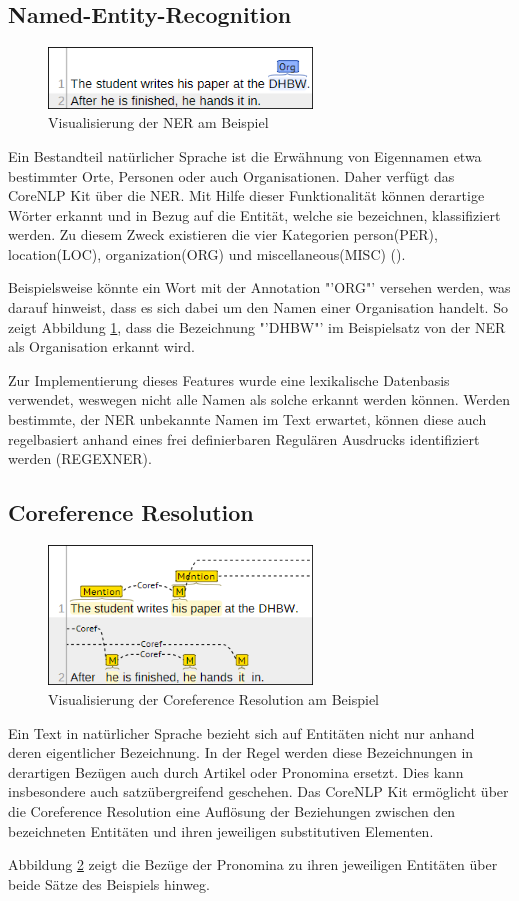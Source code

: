 \subsection{Named-Entity-Recognition}
\label{subsec:ner}
\begin{figure}
\includegraphics[width=7cm]{pictures/NER.png}
\caption{Visualisierung der NER am Beispiel}
\label{fig:NER}
\end{figure}
Ein Bestandteil natürlicher Sprache ist die Erwähnung von Eigennamen etwa bestimmter Orte, Personen oder auch Organisationen. Daher verfügt das CoreNLP Kit über die \ac{NER}. Mit Hilfe dieser Funktionalität können derartige Wörter erkannt und in Bezug auf die Entität, welche sie bezeichnen,  klassifiziert werden. Zu diesem Zweck existieren die vier Kategorien person(PER), location(LOC), organization(ORG) und miscellaneous(MISC) (\cite[vgl.][4]{STANFORDNER}).\par
Beispielsweise könnte ein Wort mit der Annotation "'ORG"' versehen werden, was darauf hinweist, dass es sich dabei um den Namen einer Organisation handelt. So zeigt Abbildung \ref{fig:NER}, dass die Bezeichnung "'DHBW"' im Beispielsatz von der \ac{NER} als Organisation erkannt wird.\par
Zur Implementierung dieses Features wurde eine lexikalische Datenbasis verwendet, weswegen nicht alle Namen als solche erkannt werden können. Werden bestimmte, der \ac{NER} unbekannte Namen im Text erwartet, können diese auch regelbasiert anhand eines frei definierbaren Regulären Ausdrucks identifiziert werden (REGEXNER).

\subsection{Coreference Resolution}
\label{subsec:coref}
\begin{figure}
\includegraphics[width=7cm]{pictures/coref.png}
\caption{Visualisierung der Coreference Resolution am Beispiel}
\label{fig:COREF}
\end{figure}
Ein Text in natürlicher Sprache bezieht sich auf Entitäten nicht nur anhand deren eigentlicher Bezeichnung. In der Regel werden diese Bezeichnungen in derartigen Bezügen auch durch Artikel oder Pronomina ersetzt. Dies kann insbesondere auch satzübergreifend geschehen. Das CoreNLP Kit ermöglicht über die Coreference Resolution eine Auflösung der Beziehungen zwischen den bezeichneten Entitäten und ihren jeweiligen substitutiven Elementen.\par
Abbildung \ref{fig:COREF} zeigt die Bezüge der Pronomina zu ihren jeweiligen Entitäten über beide Sätze des Beispiels hinweg. 

